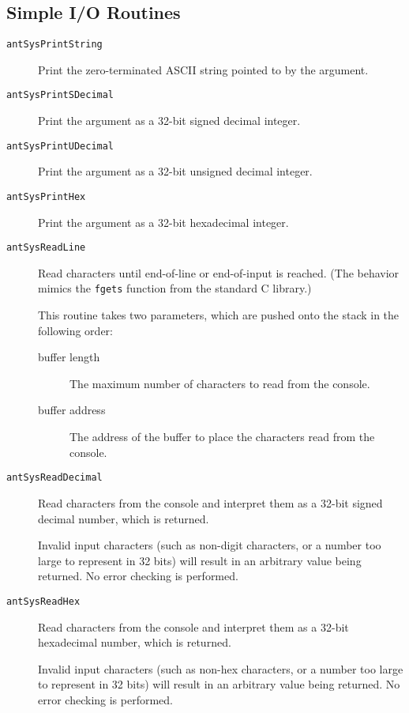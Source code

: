 \subsection{Simple I/O Routines}

\begin{description}

\item[{\tt antSysPrintString}]

	Print the zero-terminated {\sc ASCII} string pointed to by the
	argument.

\item[{\tt antSysPrintSDecimal}]

	Print the argument as a 32-bit signed decimal integer.

\item[{\tt antSysPrintUDecimal}]

	Print the argument as a 32-bit unsigned decimal integer.

\item[{\tt antSysPrintHex}]

	Print the argument as a 32-bit hexadecimal integer.

\item[{\tt antSysReadLine}]

	Read characters until end-of-line or end-of-input is reached. 
	(The behavior mimics the {\tt fgets} function from the
	standard C library.)

	This routine takes two parameters, which are pushed onto the
	stack in the following order:

	\begin{description}

	\item[buffer length] The maximum number of characters to read
		from the console.

	\item[buffer address] The address of the buffer to place the
		characters read from the console.

	\end{description}

\item[{\tt antSysReadDecimal}]

	Read characters from the console and interpret them as a
	32-bit signed decimal number, which is returned.

	Invalid input characters (such as non-digit characters, or a
	number too large to represent in 32 bits) will result in an
	arbitrary value being returned.  No error checking is
	performed.

\item[{\tt antSysReadHex}]

	Read characters from the console and interpret them as a
	32-bit hexadecimal number, which is returned.

	Invalid input characters (such as non-hex characters, or a
	number too large to represent in 32 bits) will result in an
	arbitrary value being returned.  No error checking is
	performed.

\end{description}

